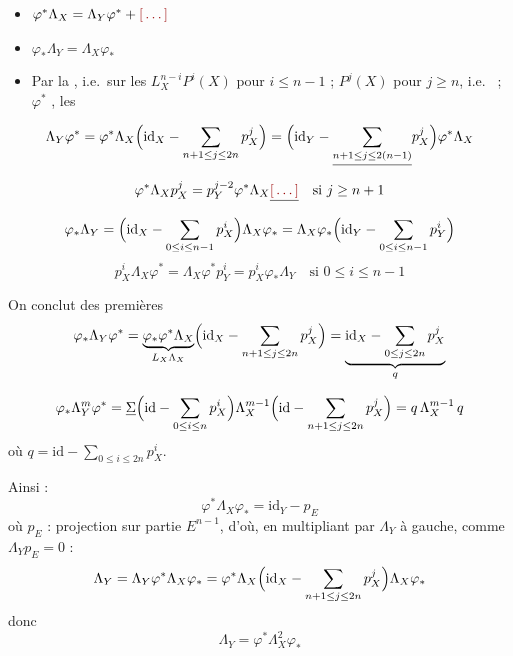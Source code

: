 \documentclass[11pt,a4paper]{article}
\begin{document}
\begin{itemize}
\item \struck{\ill{}} $\varphi^{*} \Lambda_{X} = \Lambda_{Y} \varphi^{*} + \ill{}$
\item $\varphi_{*} \Lambda_{Y} = \Lambda_{X} \varphi_{*}$
\item Par la , i.e.\ sur les
      $L^{n-i}_{X} P^{i}(X)$ pour $i \le n-1$ ; $P^{j}(X)$ pour $j \ge n$,
      i.e.\ \ill{} ; $\varphi^{*}$ \ill{}, les \ill{} \ill{}
\end{itemize}


\[
\Lambda_{Y} \varphi^{*} = \varphi^{*} \Lambda_{X}\Bigl(\mathrm{id}_{X} - \sum_{n+1 \le j \le 2n} p^{j}_{X}\Bigr)
 = \Bigl(\mathrm{id}_{Y} - \struck{\sum_{n+1 \le j \le 2(n-1)}} p^{j}_{X}\Bigr) \varphi^{*} \Lambda_{X}
\]
\[
\varphi^{*} \Lambda_{X} p^{j}_{X} = p^{j-2}_{Y} \varphi^{*} \Lambda_{X} \struck{\ill{}}
\quad \text{si } j \ge n+1
\]
\[
\varphi_{*} \Lambda_{Y} = \Bigl(\mathrm{id}_{X} - \sum_{0 \le i \le n-1} p^{i}_{X}\Bigr) \Lambda_{X} \varphi_{*}
 = \Lambda_{X} \varphi_{*} \Bigl(\mathrm{id}_{Y} - \sum_{0 \le i \le n-1} p^{i}_{Y}\Bigr)
\]
\[
p^{i}_{X} \Lambda_{X} \varphi^{*} = \Lambda_{X} \varphi^{*} p^{i}_{Y} = p^{i}_{X} \varphi_{*} \Lambda_{Y}
\quad \text{si } 0 \le i \le n-1
\]

On conclut des premières 
\[
\varphi_{*} \Lambda_{Y} \varphi^{*}
 = \underbrace{\varphi_{*}\varphi^{*} \Lambda_{X}}_{L_{X}\Lambda_{X}}
   \Bigl(\mathrm{id}_{X} - \sum_{n+1 \le j \le 2n} p^{j}_{X}\Bigr)
 = \underbrace{\mathrm{id}_{X} - \sum_{0 \le j \le 2n} p^{j}_{X}}_{q}
\]


\[
\varphi_{*} \Lambda^{m}_{Y} \varphi^{*}
 = \struck{\Sigma} \Bigl(\mathrm{id} - \sum_{0 \le i \le n} p^{i}_{X}\Bigr)
   \Lambda^{m-1}_{X} \Bigl(\mathrm{id} - \sum_{n+1 \le j \le 2n} p^{j}_{X}\Bigr)
 = q\,\Lambda^{m-1}_{X}\,q
\]
où $q = \mathrm{id} - \sum_{0 \le i \le 2n} p^{i}_{X}$.

Ainsi :
\[
\varphi^{*} \Lambda_{X} \varphi_{*} = \mathrm{id}_{Y} - p_{E}
\]
où $p_{E}$ : projection sur partie
 $E^{n-1}$, d'où, en multipliant par
$\Lambda_{Y}$ à gauche, comme $\Lambda_{Y} p_{E} = 0$ :
\[
\Lambda_{Y} = \Lambda_{Y} \varphi^{*} \Lambda_{X} \varphi_{*}
 = \varphi^{*} \Lambda_{X} \Bigl(\mathrm{id}_{X} - \sum_{n+1 \le j \le 2n} p^{j}_{X}\Bigr) \Lambda_{X} \varphi_{*}
\]
donc
\[
\boxed{\ \Lambda_{Y} = \varphi^{*} \Lambda^{2}_{X} \varphi_{*}\ }
\]
\end{document}
